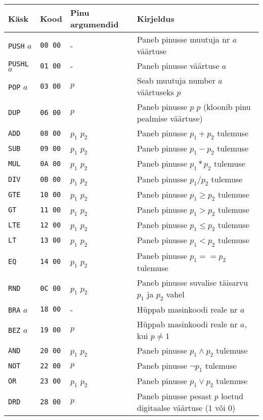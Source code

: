 \begin{longtable}{l|l|l|X}
	Käsk & Kood & Pinu argumendid & Kirjeldus \\
	\hline 
	\endhead
	\texttt{PUSH} $a$ & \texttt{00 00} & - & Paneb pinusse muutuja nr $a$ väärtuse \\
	\texttt{PUSHL} $a$ & \texttt{01 00} & - & Paneb pinusse väärtuse $a$ \\
	\texttt{POP} $a$ & \texttt{03 00}  & $p$ & Seab muutuja number $a$ väärtuseks $p$ \\
	\texttt{DUP} & \texttt{06 00} & $p$ & Paneb pinusse $p$ $p$ (kloonib pinu pealmise väärtuse) \\
	\texttt{ADD} & \texttt{08 00} & $p_1$ $p_2$ & Paneb pinusse $p_1 + p_2$ tulemuse \\
	\texttt{SUB} & \texttt{09 00} & $p_1$ $p_2$ & Paneb pinusse $p_1 - p_2$ tulemuse \\
	\texttt{MUL} & \texttt{0A 00} & $p_1$ $p_2$ & Paneb pinusse $p_1 * p_2$ tulemuse \\
	\texttt{DIV} & \texttt{0B 00} & $p_1$ $p_2$ & Paneb pinusse $p_1 / p_2$ tulemuse \\
	\texttt{GTE} & \texttt{10 00} & $p_1$ $p_2$ & Paneb pinusse $p_1 \geq p_2$ tulemuse \\
	\texttt{GT} & \texttt{11 00} & $p_1$ $p_2$ & Paneb pinusse $p_1 > p_2$ tulemuse \\
	\texttt{LTE} & \texttt{12 00} & $p_1$ $p_2$ & Paneb pinusse $p_1 \leq p_2$ tulemuse \\
	\texttt{LT} & \texttt{13 00} & $p_1$ $p_2$ & Paneb pinusse $p_1 < p_2$ tulemuse \\
	\texttt{EQ} & \texttt{14 00} & $p_1$ $p_2$ & Paneb pinusse $p_1 == p_2$ tulemuse \\
	\texttt{RND} & \texttt{0C 00} & $p_1$ $p_2$ & Paneb pinusse suvalise täisarvu $p_1$ ja $p_2$ vahel \\
	\texttt{BRA} $a$ & \texttt{18 00}  & - & Hüppab masinkoodi reale nr $a$ \\
	\texttt{BEZ} $a$ & \texttt{19 00} & $p$ & Hüppab masinkoodi reale nr $a$, kui $p \neq 1$ \\
	\texttt{AND} & \texttt{20 00} & $p_1$ $p_2$ & Paneb pinusse $p_1 \land p_2$ tulemuse \\
	\texttt{NOT} & \texttt{22 00} & $p$ & Paneb pinusse  $\neg p_1$ tulemuse \\
	\texttt{OR} & \texttt{23 00} & $p_1$ $p_2$ & Paneb pinusse $p_1 \lor p_2$ tulemuse \\
	\texttt{DRD} & \texttt{28 00} & $p$ & Paneb pinusse pesast $p$ loetud digitaalse väärtuse (1 või 0) \\

\end{longtable}
